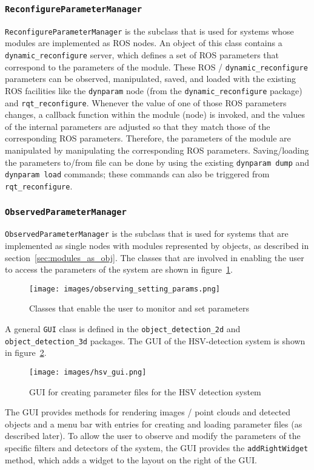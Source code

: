 \documentclass{article}
\newcommand{\code}[1]{\texttt{#1}}
\begin{document}
\subsubsection{\code{ReconfigureParameterManager}}
\code{ReconfigureParameterManager} is the subclass that is used
for systems whose modules are implemented as ROS nodes.
An object of this class contains a \code{dynamic\_reconfigure}
server, which defines a set of ROS parameters that correspond to the
parameters of the module.
These ROS / \code{dynamic\_reconfigure} parameters can be observed,
manipulated, saved, and loaded with the existing ROS facilities like
the \code{dynparam} node (from the \code{dynamic\_reconfigure} package)
and \code{rqt\_reconfigure}.
Whenever the value of one of those ROS parameters changes, a callback
function within the module (node) is invoked, and the values of the
internal parameters are adjusted so that they match those of the
corresponding ROS parameters.
Therefore, the parameters of the module are manipulated by manipulating
the corresponding ROS parameters.
Saving/loading the parameters to/from file can be done by using
the existing \code{dynparam dump} and \code{dynparam load} commands;
these commands can also be triggered from \code{rqt\_reconfigure}.


\subsubsection{\code{ObservedParameterManager}}
\code{ObservedParameterManager} is the subclass that is used for systems that
are implemented as single nodes with modules represented by objects, as
described in section~\ref{sec:modules_as_obj}.
The classes that are involved in enabling the user to access the parameters of the
system are shown in figure~\ref{fig:classes_observe_params}.
\begin{figure}
	\centering
	\texttt{[image: images/observing\_setting\_params.png]}
	\caption{Classes that enable the user to monitor and set parameters}
	\label{fig:classes_observe_params}
\end{figure}

A general \code{GUI} class is defined in the \code{object\_detection\_2d} and
\code{object\_detection\_3d} packages.
The GUI of the HSV-detection system is shown in figure~\ref{fig:hsv_gui}.
\begin{figure}
	\centering
	\texttt{[image: images/hsv\_gui.png]}
	\caption{GUI for creating parameter files for the HSV detection system}
	\label{fig:hsv_gui}
\end{figure}
The GUI provides methods for rendering images / point clouds and detected objects
and a menu bar with entries for creating and loading parameter files (as described later).
To allow the user to observe and modify the parameters of the specific filters
and detectors of the system, the GUI provides the \code{addRightWidget} method,
which adds a widget to the layout on the right of the GUI.
\end{document}
